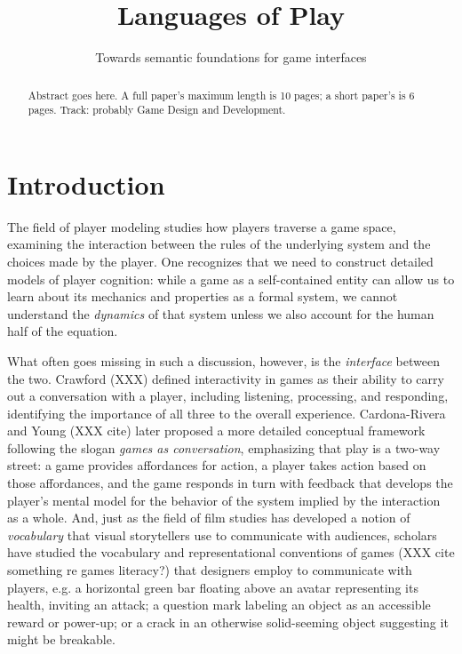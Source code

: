 \documentclass[sigconf]{acmart}
\begin{document}
\title{Languages of Play}
\subtitle{Towards semantic foundations for game interfaces}


% 


\begin{abstract}
Abstract goes here. A full paper's maximum length is 10 pages; a short
paper's is 6 pages. Track: probably Game Design and Development.
\end{abstract}



\maketitle

\section{Introduction}

The field of player modeling studies how players traverse a game space,
examining the interaction between the rules of the underlying system and
the choices made by the player. One recognizes that we need to construct
detailed models of player cognition: while a game as a self-contained
entity can allow us to learn about its mechanics and properties as a formal
system, we cannot understand the {\em dynamics} of that system unless we
also account for the human half of the equation.

What often goes missing in such a discussion, however, is the {\em
interface} between the two. Crawford (XXX) defined interactivity in games
as their ability to carry out a conversation with a player, including
listening, processing, and responding, identifying the importance of all
three to the overall experience. Cardona-Rivera and Young (XXX cite)
later proposed a more detailed conceptual framework following the slogan
{\em games as conversation}, emphasizing that play is a two-way street: a
game provides affordances for action, a player takes action based on those
affordances, and the game responds in turn with feedback that develops the
player's mental model for the behavior of the system implied by the
interaction as a whole. And, just as the field of film studies has
developed a notion of {\em vocabulary} that visual storytellers use to
communicate with audiences, scholars have studied the vocabulary and
representational conventions of games (XXX cite something re games
literacy?) that designers employ to communicate with players, e.g. a
horizontal green bar floating above an avatar representing its health,
inviting an attack; a question mark labeling an object as an accessible
reward or power-up; or a crack in an otherwise solid-seeming object
suggesting it might be breakable.
\end{document}
